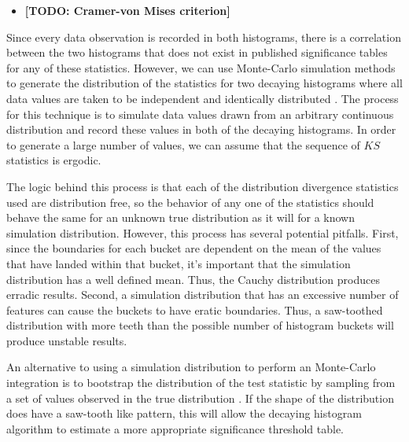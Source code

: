 \documentclass{sig-alternate}
\begin{document}
\begin{itemize}
        \begin{equation}
            J_{1:2}(X) =
                \frac{\int_{-\infty}^{\infty} \min(f_1(x), f_2(x)) d \lambda(x)}
                     {\int_{-\infty}^{\infty} \max(f_1(x), f_2(x)) d \lambda(x)} .
        \end{equation}

        [TODO: citation]

    \item{\bf [TODO: Cramer-von Mises criterion]}

    \end{itemize}

    Since every data observation is recorded in both histograms, there is a
    correlation between the two histograms that does not exist in published
    significance tables for any of these statistics. However, we can
    use Monte-Carlo simulation methods to generate the distribution of the
    statistics for two decaying histograms where all data values are taken to be
    independent and identically distributed \cite{robert2005monte}. The process
    for this technique is to simulate data values drawn from an arbitrary
    continuous distribution and record these values in both of the decaying
    histograms. In order to generate a large number of values, we can assume
    that the sequence of $KS$ statistics is ergodic.

    The logic behind this process is that each of the distribution divergence
    statistics used are distribution free, so the behavior of any one of the
    statistics should behave the same for an unknown true distribution as it
    will for a known simulation distribution. However, this process has several
    potential pitfalls. First, since the boundaries for each bucket are
    dependent on the mean of the values that have landed within that bucket,
    it's important that the simulation distribution has a well defined mean.
    Thus, the Cauchy distribution produces erradic results. Second, a simulation
    distribution that has an excessive number of features can cause the buckets
    to have eratic boundaries. Thus, a saw-toothed distribution with more teeth
    than the possible number of histogram buckets will produce unstable results.

    An alternative to using a simulation distribution to perform an Monte-Carlo
    integration is to bootstrap the distribution of the test statistic by
    sampling from a set of values observed in the true distribution
    \cite{efron1994introduction}. If the shape of the distribution does have a
    saw-tooth like pattern, this will allow the decaying histogram algorithm to
    estimate a more appropriate significance threshold table.
\end{document}
